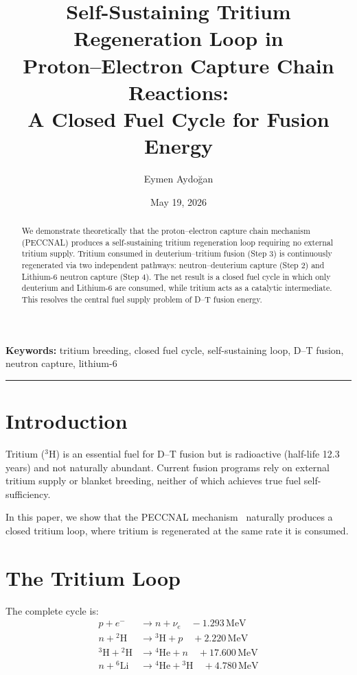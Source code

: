 \documentclass[12pt,a4paper]{article}
\title{\textbf{Self-Sustaining Tritium Regeneration Loop in\\
Proton--Electron Capture Chain Reactions:\\
A Closed Fuel Cycle for Fusion Energy}}
\author{Eymen Aydoğan}
\date{May 19, 2026}
\begin{document}
\maketitle

\begin{abstract}
We demonstrate theoretically that the proton--electron capture chain
mechanism (PECCNAL) produces a self-sustaining tritium regeneration
loop requiring no external tritium supply. Tritium consumed in
deuterium--tritium fusion (Step 3) is continuously regenerated via
two independent pathways: neutron--deuterium capture (Step 2) and
Lithium-6 neutron capture (Step 4). The net result is a closed fuel
cycle in which only deuterium and Lithium-6 are consumed, while
tritium acts as a catalytic intermediate. This resolves the central
fuel supply problem of D--T fusion energy.
\end{abstract}

\noindent\textbf{Keywords:} tritium breeding, closed fuel cycle,
self-sustaining loop, D--T fusion, neutron capture, lithium-6

\hrule\vspace{1em}

\section{Introduction}
Tritium ($^3$H) is an essential fuel for D--T fusion but is
radioactive (half-life 12.3 years) and not naturally abundant.
Current fusion programs rely on external tritium supply or blanket
breeding, neither of which achieves true fuel self-sufficiency.

In this paper, we show that the PECCNAL mechanism~\cite{aydogan2026a,aydogan2026b}
naturally produces a closed tritium loop, where tritium is
regenerated at the same rate it is consumed.

\section{The Tritium Loop}

The complete cycle is:
\begin{align}
p + e^- &\rightarrow n + \nu_e \quad -1.293\,\text{MeV} \tag{S1}\\
n + {}^2\text{H} &\rightarrow {}^3\text{H} + p \quad +2.220\,\text{MeV} \tag{S2}\\
{}^3\text{H} + {}^2\text{H} &\rightarrow {}^4\text{He} + n \quad +17.600\,\text{MeV} \tag{S3}\\
n + {}^6\text{Li} &\rightarrow {}^4\text{He} + {}^3\text{H} \quad +4.780\,\text{MeV} \tag{S4}
\end{align}
\end{document}
